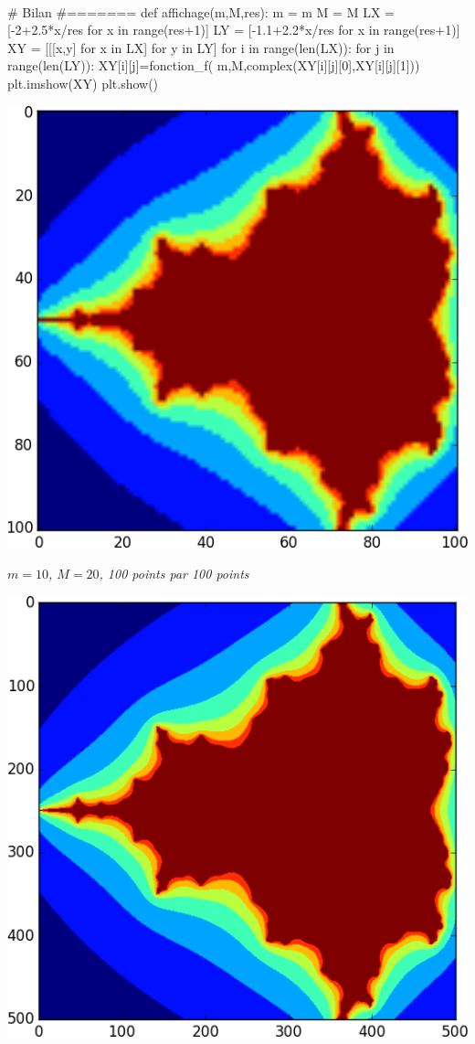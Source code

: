 \documentclass[10pt,fleqn]{article} %
\begin{document}
\begin{multicols}{2}
\begin{corrige}
$\quad$
\begin{python}

# Bilan 
#=======
def affichage(m,M,res):
    m = m
    M = M
    LX = [-2+2.5*x/res for x in range(res+1)]
    LY = [-1.1+2.2*x/res for x in range(res+1)]
    XY = [[[x,y] for x in LX] for y in LY]
    for i in range(len(LX)):
        for j in range(len(LY)):
            XY[i][j]=fonction_f(
                m,M,complex(XY[i][j][0],XY[i][j][1]))
    plt.imshow(XY)
    plt.show()
\end{python}
\end{corrige}

\begin{center}
\includegraphics[width=.8\linewidth]{programmes/Exercice_09/10_20_100}

\textit{$m=10$, $M=20$, 100 points par 100 points}
\end{center}

\begin{center}
\includegraphics[width=.8\linewidth]{programmes/Exercice_09/10_20_500}


\end{center}
\end{multicols}
\end{document}
